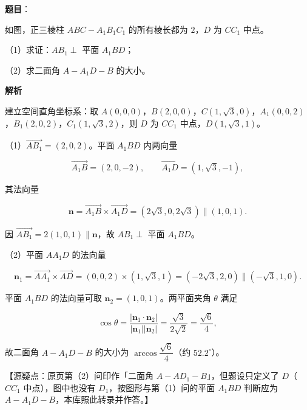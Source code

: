 \begin{answer}

\textbf{题目}：

如图，正三棱柱 $ABC-A_1B_1C_1$ 的所有棱长都为 $2$，$D$ 为 $CC_1$ 中点。

（1）求证：$AB_1\perp$ 平面 $A_1BD$；

（2）求二面角 $A-A_1D-B$ 的大小。
\nopagebreak[4]
\begin{center}\end{center}
\nopagebreak[4]
\textbf{解析}

建立空间直角坐标系：取 $A(0,0,0)$，$B(2,0,0)$，$C(1,\sqrt3,0)$，$A_1(0,0,2)$，$B_1(2,0,2)$，$C_1(1,\sqrt3,2)$，则 $D$ 为 $CC_1$ 中点，$D(1,\sqrt3,1)$。

（1）$\overrightarrow{AB_1}=(2,0,2)$。平面 $A_1BD$ 内两向量

\nopagebreak[4]
\[\overrightarrow{A_1B}=(2,0,-2),\qquad \overrightarrow{A_1D}=(1,\sqrt3,-1),\]

其法向量

\nopagebreak[4]
\[\boldsymbol n=\overrightarrow{A_1B}\times\overrightarrow{A_1D}=\left(2\sqrt3,0,2\sqrt3\right)\parallel(1,0,1).\]

因 $\overrightarrow{AB_1}=2(1,0,1)\parallel\boldsymbol n$，故 $AB_1\perp$ 平面 $A_1BD$。

（2）平面 $AA_1D$ 的法向量

\nopagebreak[4]
\[\boldsymbol n_1=\overrightarrow{AA_1}\times\overrightarrow{AD}=(0,0,2)\times(1,\sqrt3,1)=\left(-2\sqrt3,2,0\right)\parallel\left(-\sqrt3,1,0\right).\]

平面 $A_1BD$ 的法向量可取 $\boldsymbol n_2=(1,0,1)$。两平面夹角 $\theta$ 满足

\nopagebreak[4]
\[\cos\theta=\frac{\left|\boldsymbol n_1\cdot\boldsymbol n_2\right|}{\left|\boldsymbol n_1\right|\left|\boldsymbol n_2\right|}
=\frac{\sqrt3}{2\sqrt2}=\frac{\sqrt6}4,\]

故二面角 $A-A_1D-B$ 的大小为 $\arccos\dfrac{\sqrt6}4$（约 $52.2^\circ$）。

【源疑点：原页第（2）问印作「二面角 $A-AD_1-B$」，但题设只定义了 $D$（$CC_1$ 中点），图中也没有 $D_1$，按图形与第（1）问的平面 $A_1BD$ 判断应为 $A-A_1D-B$，本库照此转录并作答。】


\end{answer}
